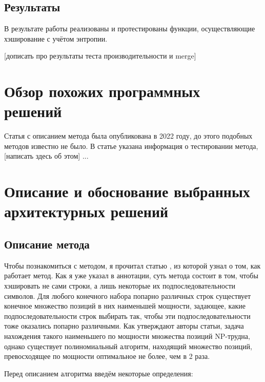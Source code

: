 \documentclass[a4paper,12pt]{extarticle}
\begin{document}
\begin{sloppypar}
\subsection{Результаты}

В результате работы реализованы и протестированы функции, осуществляющие хэширование с учётом энтропии.

[дописать про результаты теста производительности и merge]

\pagebreak

\section{Обзор похожих программных решений}

Статья с описанием метода \cite{the_paper} была опубликована в 2022 году, до этого подобных методов известно не было. В статье указана информация о тестировании метода, [написать здесь об этом] ...

\newpage

\section{Описание и обоснование выбранных архитектурных решений}
\subsection{Описание метода}
Чтобы познакомиться с методом, я прочитал статью \cite{the_paper}, из которой узнал о том, как работает метод. Как я уже указал в аннотации, суть метода состоит в том, чтобы хэшировать не сами строки, а лишь некоторые их подпоследовательности символов. Для любого конечного набора попарно различных строк существует конечное множество позиций в них наименьшей мощности, задающее, какие подпоследовательности строк выбирать так, чтобы эти подпоследовательности тоже оказались попарно различными. Как утверждают авторы статьи, задача нахождения такого наименьшего по мощности множества позиций NP-трудна, однако существует полиномиальный алгоритм, находящий множество позиций, превосходящее по мощности оптимальное не более, чем в 2 раза.

Перед описанием алгоритма введём некоторые определения:


\end{sloppypar}
\end{document}
